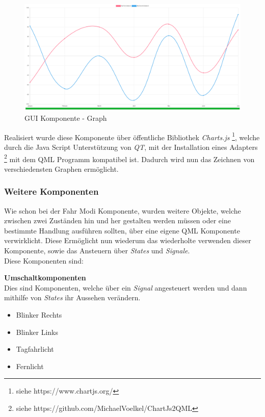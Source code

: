 \begin{figure}[H]
	\begin{center}
		\includegraphics[scale=0.25]{figures/hcis/component_graph.png}
		\caption{GUI Komponente - Graph}
				\label{fig:kompGraph}
	\end{center}
\end{figure}

Realisiert wurde diese Komponente über öffentliche Bibliothek \textit{Charts.js} \footnote{siehe https://www.chartjs.org/}, welche durch die Java Script Unterstützung von \textit{QT}, mit der Installation eines Adapters \footnote{siehe https://github.com/MichaelVoelkel/ChartJs2QML} mit dem QML Programm kompatibel ist. Dadurch wird nun das Zeichnen von verschiedensten Graphen ermöglicht.

\subsubsection{Weitere Komponenten}

Wie schon bei der Fahr Modi Komponente, wurden weitere Objekte, welche zwischen zwei Zuständen hin und her gestalten werden müssen oder eine bestimmte Handlung ausführen sollten, über eine eigene QML Komponente verwirklicht. Diese Ermöglicht nun wiederum das wiederholte verwenden dieser Komponente, sowie das Ansteuern über \textit{States} und \textit{Signale}.\\
Diese Komponenten sind:

\textbf{Umschaltkomponenten}\\
Dies sind Komponenten, welche über ein \textit{Signal} angesteuert werden und dann mithilfe von \textit{States} ihr Aussehen verändern.

\begin{itemize}
	
	\item Blinker Rechts
	\item Blinker Links
	\item Tagfahrlicht
	\item Fernlicht
	
\end{itemize}

